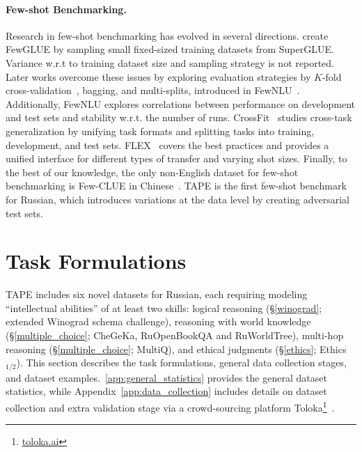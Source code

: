 \documentclass[11pt]{article}
\begin{document}
\paragraph{Few-shot Benchmarking.} Research in few-shot benchmarking has evolved in several directions. \citet{schick-schutze-2021-just} create FewGLUE by sampling small fixed-sized training datasets from SuperGLUE. Variance w.r.t to training dataset size and sampling strategy is not reported. Later works overcome these issues by exploring evaluation strategies by $K$-fold cross-validation~\cite{perez2021true}, bagging, and multi-splits, introduced in FewNLU~\cite{zheng-etal-2022-fewnlu}. Additionally, FewNLU explores correlations between performance on development and test sets and stability w.r.t. the number of runs. CrossFit~\cite{ye-etal-2021-crossfit} studies cross-task generalization by unifying task formats and splitting tasks into training, development, and test sets. FLEX~\cite{bragg2021flex} covers the best practices and provides a unified interface for different types of transfer and varying shot sizes. Finally, to the best of our knowledge, the only non-English dataset for few-shot benchmarking is Few-CLUE in Chinese~\cite{xu2021fewclue}. TAPE is the first few-shot benchmark for Russian, which introduces variations at the data level by creating adversarial test sets. 

 

\section{Task Formulations}
\label{sec:task_formulation}
TAPE includes six novel datasets for Russian, each requiring modeling ``intellectual abilities'' of at least two skills: logical reasoning (\S\ref{winograd}; extended Winograd schema challenge), reasoning with world knowledge (\S\ref{multiple_choice}; CheGeKa, RuOpenBookQA and RuWorldTree), multi-hop reasoning (\S\ref{multiple_choice}; MultiQ), and ethical judgments (\S\ref{ethics}; Ethics$_{1/2}$). This section describes the task formulations, general data collection stages, and dataset examples.~\autoref{app:general_statistics} provides the general dataset statistics, while Appendix~\ref{app:data_collection} includes details on dataset collection and extra validation stage via a crowd-sourcing platform Toloka\footnote{\href{https://toloka.ai/}{toloka.ai}}~\cite{toloka}.
\end{document}
